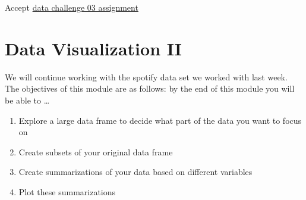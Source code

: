 \documentclass[
]{book}
\begin{document}
Accept \href{https://classroom.github.com/a/DtxQhRcW}{data challenge 03 assignment}

\hypertarget{data-visualization-ii}{%
\chapter{Data Visualization II}\label{data-visualization-ii}}

We will continue working with the spotify data set we worked with last week. The objectives of this module are as follows: by the end of this module you will be able to \ldots{}

\begin{enumerate}
\def\labelenumi{\arabic{enumi})}
\item
  Explore a large data frame to decide what part of the data you want to focus on
\item
  Create subsets of your original data frame
\item
  Create summarizations of your data based on different variables
\item
  Plot these summarizations
\end{enumerate}
\end{document}
